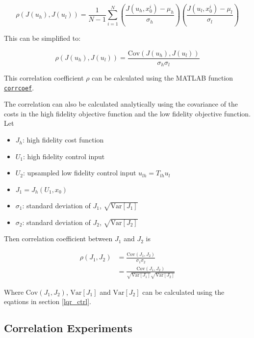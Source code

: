 \documentclass{article}
\begin{document}
\begin{equation}
  \rho(J(u_h), J(u_l)) = \frac{1}{N-1} \sum_{i=1}^{N} \left( \frac{J(u_h, x_0^i) - \mu_h}{\sigma_h} \right) \left( \frac{J(u_l, x_0^i) - \mu_l}{\sigma_l} \right)
\end{equation}

This can be simplified to:

\begin{equation}
  \rho(J(u_h), J(u_l)) = \frac{\text{Cov}(J(u_h), J(u_l))}{\sigma_h \sigma_l}
\end{equation}

This correlation coefficient $\rho$ can be calculated using the MATLAB function \href{https://www.mathworks.com/help/matlab/ref/corrcoef.html#bunkaln}{\texttt{corrcoef}}.

The correlation can also be calculated analytically using the covariance of the costs in the high fidelity objective function and the low fidelity objective function.
Let

\begin{itemize}
  \item $J_h$: high fidelity cost function
  \item $U_1$: high fidelity control input
  \item $U_2$: upsampled low fidelity control input $u_{lh} = T_{lh} u_l$
  \item $J_1 = J_h(U_1, x_0)$
  \item $\sigma_1$: standard deviation of $J_1$, $\sqrt{\text{Var}[J_1]}$
  \item $\sigma_2$: standard deviation of $J_2$, $\sqrt{\text{Var}[J_2]}$
\end{itemize}

Then correlation coefficient between $J_1$ and $J_2$ is

\begin{equation}
  \begin{aligned}
    \rho(J_1, J_2) &= \frac{\text{Cov}(J_1, J_2)}{\sigma_1 \sigma_2} \\
    &= \frac{\text{Cov}(J_1, J_2)}{\sqrt{\text{Var}[J_1]} \sqrt{\text{Var}[J_2]}}
  \end{aligned}
\end{equation}

Where $\text{Cov}(J_1, J_2)$, $\text{Var}[J_1]$ and $\text{Var}[J_2]$ can be calculated using the eqations in section \ref{lqr_ctrl}.

\subsection{Correlation Experiments}
\end{document}

